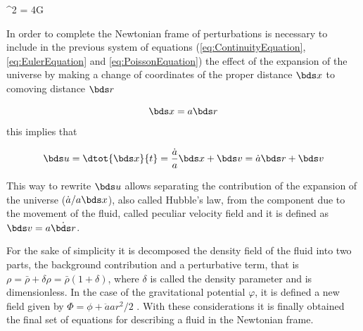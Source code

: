 { \nabla^2 \varphi = 4\pi G \rho }


In order to complete the Newtonian frame of perturbations is necessary to 
include in the previous system of equations (\ref{eq:ContinuityEquation}, 
\ref{eq:EulerEquation} and \ref{eq:PoissonEquation}) the effect of the 
expansion of the universe by making a change of coordinates of the proper
distance $\bds x$ to comoving distance $\bds r$


\[\bds x = a \bds r\]
this implies that



\[\bds u = \dtot{\bds x}{t} = 
\frac{\dot a}{a}\bds x + \bds v = \dot a \bds r + \bds v\]


This way to rewrite $\bds u$ allows separating the contribution of the 
expansion of the universe ($\dot a/a \bds x$), also called Hubble's law,
from the component due to the movement of the fluid, called peculiar 
velocity field and it is defined as $\bds v = a \dot{ \bds r}$.


For the sake of simplicity it is decomposed the density field of the fluid 
into two parts, the background contribution and a perturbative term, that 
is $\rho = \bar \rho + \delta\rho = \bar \rho( 1+ \delta )$, where $\delta$
is called the density parameter and is dimensionless. In the case of the 
gravitational potential $\varphi$, it is defined a new field given by 
$ \Phi = \phi + \ddot a a r^2/2$ \cite{longair2008}. With these 
considerations it is finally obtained the final set of equations for 
describing a fluid in the Newtonian frame.


